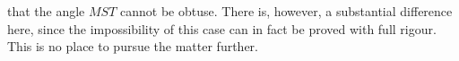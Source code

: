 %
that the angle \(MST\) cannot be obtuse. There is, however, a substantial difference here, since the impossibility of this case can in fact be proved with full rigour. This is no place to pursue the matter further.

